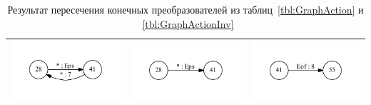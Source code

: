 \documentclass{matmex-diploma}
\begin{document}
\begin{table}[h]
\begin{tabular}{ | c | c | c |}
    \begin{minipage}{.3\textwidth}
      \includegraphics[width=\linewidth]{28_int}
    \end{minipage}
    &
    \begin{minipage}{.3\textwidth}
      \includegraphics[width=\linewidth]{28_1_int}   
    \end{minipage}
    & 
    \begin{minipage}{.3\textwidth}
      \includegraphics[width=\linewidth]{41_int}
    \end{minipage}
    \\ \hline
  \end{tabular}
  \caption{Результат пересечения конечных преобразователей из таблиц~\ref{tbl:GraphAction} и ~\ref{tbl:GraphActionInv}}
  \label{tbl:GraphActionInters}
\end{table}
\end{document}
